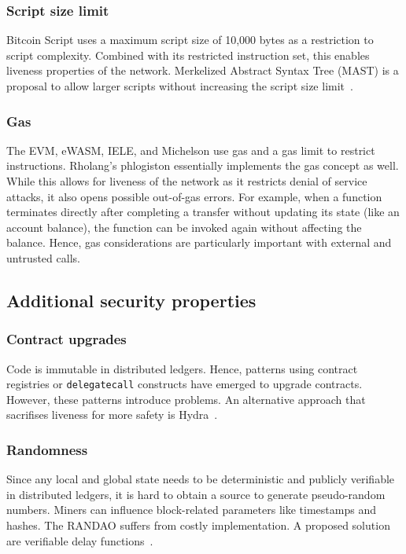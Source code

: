 \subsubsection{Script size limit}
Bitcoin Script uses a maximum script size of 10,000 bytes as a restriction to script complexity. Combined with its restricted instruction set, this enables liveness properties of the network. Merkelized Abstract Syntax Tree (MAST) is a proposal to allow larger scripts without increasing the script size limit~\cite{Harding2017}.

\subsubsection{Gas}
The EVM, eWASM, IELE, and Michelson use gas and a gas limit to restrict instructions. Rholang's phlogiston essentially implements the gas concept as well. While this allows for liveness of the network as it restricts denial of service attacks, it also opens possible out-of-gas errors. For example, when a function terminates directly after completing a transfer without updating its state (like an account balance), the function can be invoked again without affecting the balance.
Hence, gas considerations are particularly important with external and untrusted calls.


\subsection{Additional security properties} 
\subsubsection{Contract upgrades}
Code is immutable in distributed ledgers. Hence, patterns using contract registries or \texttt{delegatecall} constructs have emerged to upgrade contracts. However, these patterns introduce problems. An alternative approach that sacrifises liveness for more safety is Hydra~\cite{Breidenbach2018}.

\subsubsection{Randomness}
Since any local and global state needs to be deterministic and publicly verifiable in distributed ledgers, it is hard to obtain a source to generate pseudo-random numbers.
Miners can influence block-related parameters like timestamps and hashes. The RANDAO suffers from costly implementation. A proposed solution are verifiable delay functions~\cite{Boneh2018}.

